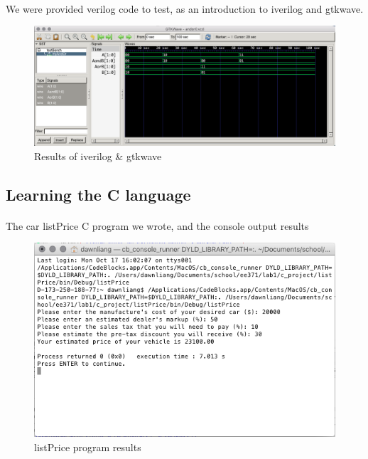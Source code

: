 \documentclass{article}
\begin{document}
	\paragraph{} We were provided verilog code to test, as an introduction to iverilog and gtkwave.

	
	
	

	\begin{figure}[H]
	  \centering
	  \includegraphics[width=0.75\linewidth]{figures/iverilog_gtkwave.png}
	  \caption{Results of iverilog \& gtkwave}
	  \label{fig:iverilog_gtkwave}
	\end{figure}


\subsection{Learning the C language}
	\paragraph{} The car listPrice C program we wrote, and the console output results
	

	\begin{figure}[H]
		\centering
		\includegraphics[width=0.75\linewidth]{figures/listPrice_results.png}
		\caption{listPrice program results}
		\label{fig:listPrice_results}
	\end{figure}
\end{document}
